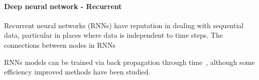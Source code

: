 \paragraph{Deep neural network - Recurrent}
Recurrent neural networks (RNNs) have reputation in dealing with sequential data, particular in places where data is independent to time steps. The connections between nodes in RNNs 


RNNs models can be trained via back propagation through time~\cite{Goodfellow-et-al-2016}, although some efficiency improved methods have been studied.~\cite{963769,neco.1989,Gomez:2008:ANE:1390681.1390712}